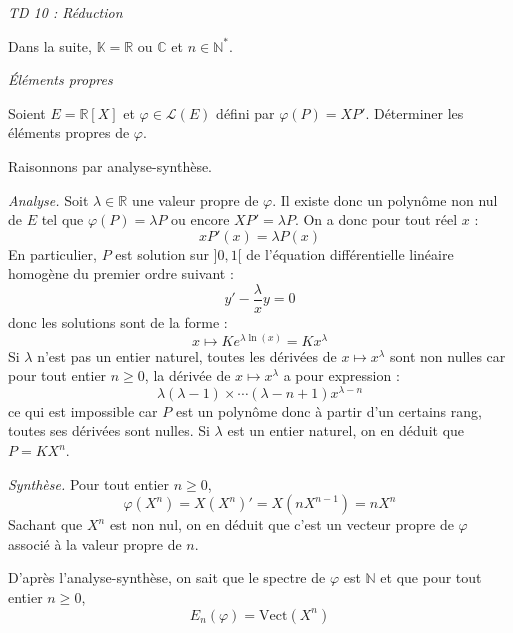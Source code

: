 \documentclass[a4paper,10pt]{report}
\begin{document}
\everymath{\displaystyle}
\begin{center}
\textit{{ {\huge TD 10 : Réduction}}}
\end{center}

\bigskip


\noindent Dans la suite, $\mathbb{K} = \mathbb{R}$ ou $\mathbb{C}$ et $n \in \mathbb{N}^*$.

\medskip

\begin{center}
\textit{{ {\large Éléments propres}}}
\end{center}

\medskip

\begin{Exa} Soient $E = \mathbb{R}[X]$ et $\varphi \in \mathcal{L}(E)$ défini par $\varphi(P)=XP'$. Déterminer les éléments propres de $\varphi$.
\end{Exa}

\corr Raisonnons par analyse-synthèse. 

\medskip

\noindent \textit{Analyse.} Soit $\lambda \in \mathbb{R}$ une valeur propre de $\varphi$. Il existe donc un polynôme non nul de $E$ tel que $\varphi(P)=\lambda P$ ou encore $XP' = \lambda P$. On a donc pour tout réel $x$ :
$$ x P'(x) = \lambda P(x)$$
En particulier, $P$ est solution sur $]0,1[$ de l'équation différentielle linéaire homogène du premier ordre suivant :
$$ y' - \dfrac{\lambda}{x} y = 0$$
donc les solutions sont de la forme :
$$ x \mapsto K e^{\lambda \ln(x)} = K x^{\lambda}$$
Si $\lambda$ n'est pas un entier naturel, toutes les dérivées de $x \mapsto x^{\lambda}$ sont non nulles car pour tout entier $n \geq 0$, la dérivée de $x \mapsto x^{\lambda}$ a pour expression :
$$ \lambda (\lambda-1) \times \cdots (\lambda-n+1) x^{\lambda -n}$$
ce qui est impossible car $P$ est un polynôme donc à partir d'un certains rang, toutes ses dérivées sont nulles. Si $\lambda$ est un entier naturel, on en déduit que $P= K X^n$.

\medskip

\noindent \textit{Synthèse.} Pour tout entier $n \geq 0$,
$$ \varphi(X^n) = X(X^n)'=X(nX^{n-1})=nX^n$$
Sachant que $X^n$ est non nul, on en déduit que c'est un vecteur propre de $\varphi$ associé à la valeur propre de $n$.

\medskip

\noindent D'après l'analyse-synthèse, on sait que le spectre de $\varphi$ est $\mathbb{N}$ et que pour tout entier $n \geq 0$,
$$ E_{n}(\varphi) = \textrm{Vect}(X^n)$$
\end{document}
